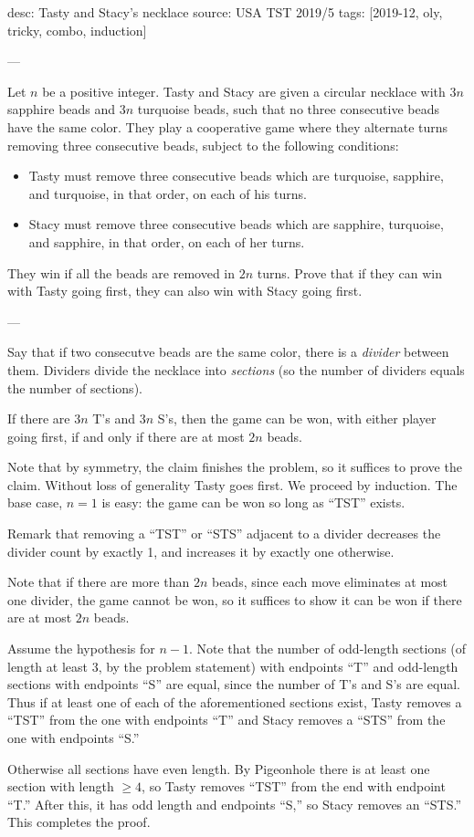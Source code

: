 desc: Tasty and Stacy's necklace
source: USA TST 2019/5
tags: [2019-12, oly, tricky, combo, induction]

---

Let $n$ be a positive integer. Tasty and Stacy are given a circular necklace with $3n$ sapphire beads and $3n$ turquoise beads, such that no three consecutive beads have the same color. They play a cooperative game where they alternate turns removing three consecutive beads, subject to the following conditions:
\begin{itemize}
    \item Tasty must remove three consecutive beads which are turquoise, sapphire, and turquoise, in that order, on each of his turns.
    \item Stacy must remove three consecutive beads which are sapphire, turquoise, and sapphire, in that order, on each of her turns.
\end{itemize}
They win if all the beads are removed in $2n$ turns. Prove that if they can win with Tasty going first, they can also win with Stacy going first.

---

Say that if two consecutve beads are the same color, there is a \emph{divider} between them. Dividers divide the necklace into \emph{sections} (so the number of dividers equals the number of sections).
\begin{claim*}
    If there are $3n$ T's and $3n$ S's, then the game can be won, with either player going first, if and only if there are at most $2n$ beads.
\end{claim*}
Note that by symmetry, the claim finishes the problem, so it suffices to prove the claim. Without loss of generality Tasty goes first. We proceed by induction. The base case, $n=1$ is easy: the game can be won so long as ``TST'' exists.

Remark that removing a ``TST'' or ``STS'' adjacent to a divider decreases the divider count by exactly 1, and increases it by exactly one otherwise.

Note that if there are more than $2n$ beads, since each move eliminates at most one divider, the game cannot be won, so it suffices to show it can be won if there are at most $2n$ beads.

Assume the hypothesis for $n-1$. Note that the number of odd-length sections (of length at least $3$, by the problem statement) with endpoints ``T'' and odd-length sections with endpoints ``S'' are equal, since the number of T's and S's are equal. Thus if at least one of each of the aforementioned sections exist, Tasty removes a ``TST'' from the one with endpoints ``T'' and Stacy removes a ``STS'' from the one with endpoints ``S.''

Otherwise all sections have even length. By Pigeonhole there is at least one section with length $\ge4$, so Tasty removes ``TST'' from the end with endpoint ``T.'' After this, it has odd length and endpoints ``S,'' so Stacy removes an ``STS.'' This completes the proof.
